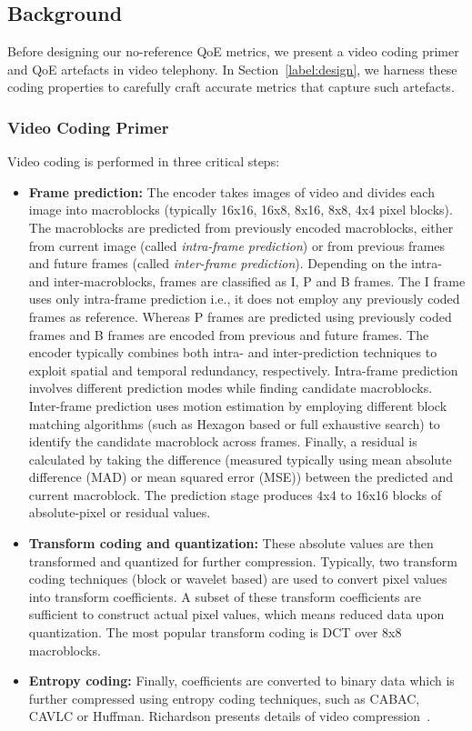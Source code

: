 \subsection{Background} \label{label:background}

Before designing our no-reference QoE metrics, we present a video coding primer and QoE artefacts in video telephony.
In Section~\ref{label:design}, we harness these coding properties to carefully craft accurate metrics that capture such artefacts.

\subsubsection{Video Coding Primer}
Video coding is performed in three critical steps: 

\begin{itemize}[leftmargin=*]
\item \textbf{Frame prediction:}
    The encoder takes images of video and divides each image into macroblocks (typically 16x16, 16x8, 8x16, 8x8, 4x4 pixel blocks). The macroblocks are predicted from previously encoded macroblocks, either from current image (called \emph{intra-frame prediction}) or from previous frames and future frames (called \emph{inter-frame prediction}). Depending on the intra- and inter-macroblocks, frames are classified as I, P and B frames. The I frame uses only intra-frame prediction i.e., it does not employ any previously coded frames as reference. Whereas P frames are predicted using previously coded frames and B frames are encoded from previous and future frames. The encoder typically combines both intra- and inter-prediction techniques to exploit spatial and temporal redundancy, respectively. Intra-frame prediction involves different prediction modes \cite{richardson2004h} while finding candidate macroblocks. Inter-frame prediction uses motion estimation by employing different block matching algorithms (such as Hexagon based or full exhaustive search) to identify the candidate macroblock across frames. Finally, a residual is calculated by taking the difference (measured typically using mean absolute difference (MAD) or mean squared error (MSE)) between the predicted and current macroblock. The prediction stage produces 4x4 to 16x16 blocks of absolute-pixel or residual values. 

\item \textbf{Transform coding and quantization:}
These absolute values are then transformed and quantized for further compression. Typically, two transform coding techniques (block or wavelet based) are used to convert pixel values into transform coefficients. A subset of these transform coefficients are sufficient to construct actual pixel values, which means reduced data upon quantization. The most popular transform coding is DCT over 8x8 macroblocks. 

\item \textbf{Entropy coding:}
Finally, coefficients are converted to binary data which is further compressed using entropy coding techniques, such as CABAC, CAVLC or Huffman. Richardson presents details of video compression~\cite{richardson2004h}.
\end{itemize}

